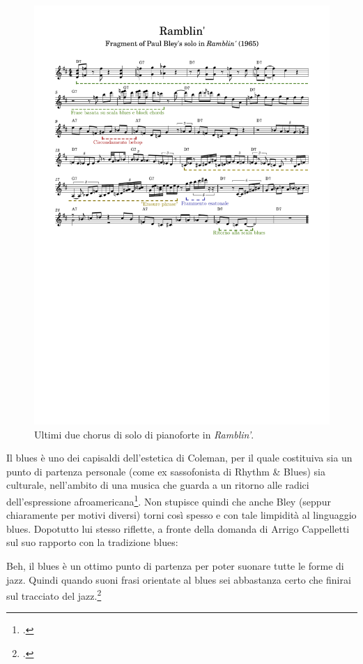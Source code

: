 \begin{figure}[h]
	\centering
	\includegraphics[clip,trim=1cm 13cm 1cm 3.5cm, width=\textwidth]{ramblin analysis.pdf}
	\caption{Ultimi due chorus di solo di pianoforte in \textit{Ramblin'}.}
	\label{fig:ramblin}
\end{figure}
Il blues è uno dei capisaldi dell'estetica di Coleman, per il quale costituiva sia un punto di partenza personale (come ex sassofonista di Rhythm \& Blues) sia culturale, nell'ambito di una musica che guarda a un ritorno alle radici dell'espressione afroamericana\footcite[38]{Cogswell1989}. Non stupisce quindi che anche Bley (seppur chiaramente per motivi diversi) torni così spesso e con tale limpidità al linguaggio blues. Dopotutto lui stesso riflette, a fronte della domanda di Arrigo Cappelletti sul suo rapporto con la tradizione blues:
\begin{fquote}
	Beh, il blues è un ottimo punto di partenza per poter suonare tutte le forme di jazz. Quindi quando suoni frasi orientate al blues sei abbastanza certo che finirai sul tracciato del jazz.\footcite[135]{cappelletti}
\end{fquote}
